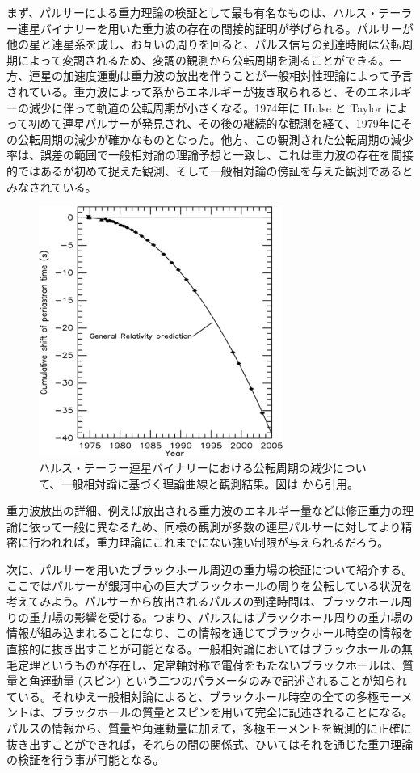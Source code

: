 まず、パルサーによる重力理論の検証として最も有名なものは、ハルス・テーラー連星バイナリーを用いた重力波の存在の間接的証明が挙げられる。パルサーが他の星と連星系を成し、お互いの周りを回ると、パルス信号の到達時間は公転周期によって変調されるため、変調の観測から公転周期を測ることができる。一方、連星の加速度運動は重力波の放出を伴うことが一般相対性理論によって予言されている。重力波によって系からエネルギーが抜き取られると、そのエネルギーの減少に伴って軌道の公転周期が小さくなる。1974年に Hulse と Taylor によって初めて連星パルサーが発見され、その後の継続的な観測を経て、1979年にその公転周期の減少が確かなものとなった。他方、この観測された公転周期の減少率は、誤差の範囲で一般相対論の理論予想と一致し、これは重力波の存在を間接的ではあるが初めて捉えた観測、そして一般相対論の傍証を与えた観測であるとみなされている。
\begin{figure}[t]
\begin{center}
\includegraphics[width=80mm]{pulsar/binary_pulsar.eps}
\caption{
ハルス・テーラー連星バイナリーにおける公転周期の減少について、一般相対論に基づく理論曲線と観測結果。図は \cite{Weisberg:2004hi} から引用。
}
\label{fig_HT}
\end{center}
\end{figure}
重力波放出の詳細、例えば放出される重力波のエネルギー量などは修正重力の理論に依って一般に異なるため、同様の観測が多数の連星パルサーに対してより精密に行われれば，重力理論にこれまでにない強い制限が与えられるだろう。

次に、パルサーを用いたブラックホール周辺の重力場の検証について紹介する。ここではパルサーが銀河中心の巨大ブラックホールの周りを公転している状況を考えてみよう。パルサーから放出されるパルスの到達時間は、ブラックホール周りの重力場の影響を受ける。つまり、パルスにはブラックホール周りの重力場の情報が組み込まれることになり、この情報を通じてブラックホール時空の情報を直接的に抜き出すことが可能となる。一般相対論においてはブラックホールの無毛定理というものが存在し、定常軸対称で電荷をもたないブラックホールは、質量と角運動量 (スピン) という二つのパラメータのみで記述されることが知られている。それゆえ一般相対論によると、ブラックホール時空の全ての多極モーメントは、ブラックホールの質量とスピンを用いて完全に記述されることになる。パルスの情報から、質量や角運動量に加えて，多極モーメントを観測的に正確に抜き出すことができれば，それらの間の関係式、ひいてはそれを通じた重力理論の検証を行う事が可能となる。

